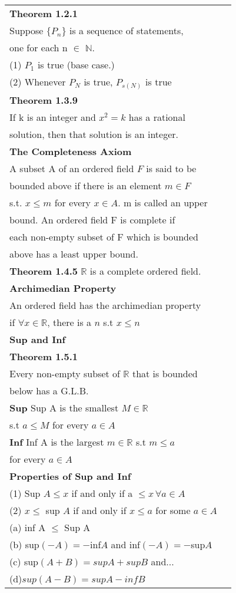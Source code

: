 \documentclass[10 pt,landscape]{article}
\begin{document}
\raggedright
\footnotesize
\begin{multicols}{4}


\begin{tabular}{@{}ll@{}}

\textbf{Theorem 1.2.1}\\
Suppose $\{P_n\}$ is a sequence of statements,\\ one for each n $\in$ $\mathbb{N}$. \\
(1) $P_1$ is true (base case.) \\
(2) Whenever $P_N$ is true, $P_{s(N)}$ is true\\

\textbf{Theorem 1.3.9}\\
If k is an integer and $x^2=k$ has a rational \\solution, then that solution is an integer.\\
\textbf{The Completeness Axiom}\\
A subset A of an ordered field $F$ is said to be\\ bounded above if there is an element $m\in F$\\ s.t. $x\leq m$ for every $x\in A$. m is called an upper\\ bound.  An ordered field F is complete if \\each non-empty subset of F which is bounded \\above has a least upper bound.\\
\textbf{Theorem 1.4.5}  $\mathbb{R}$ is a complete ordered field.\\
\textbf{Archimedian Property} \\
An ordered field has the archimedian property \\ if $\forall x \in \mathbb{R}$, there is a $n$ s.t $x\le n$\\
\textbf{Sup and Inf}\\
\textbf{Theorem 1.5.1} \\Every non-empty subset of $\mathbb{R}$ that is bounded\\ below has a G.L.B.\\
\textbf{Sup} Sup A is the smallest $M \in \mathbb{R}$ \\s.t $a\leq M$ for every $a \in A$\\
\textbf{Inf} Inf A is the largest $m \in \mathbb{R}$ s.t $m\leq a$ \\for every $a \in A$\\
\textbf{Properties of Sup and Inf}\\
(1) Sup $A \leq x$ if and only if a $\leq x \, \forall a \in A$\\
(2) $x\le$ sup $A$ if and only if $x \le a$ for some $a \in A$\\
(a) inf A $\le$ Sup A\\
(b) sup$(-A)=-$inf$A$ and inf$(-A)=-$sup$A$\\
(c) sup$(A+B) = supA + supB$ and...\\
(d)$sup(A-B)=supA - infB$\\


\end{tabular}
\end{multicols}
\end{document}
